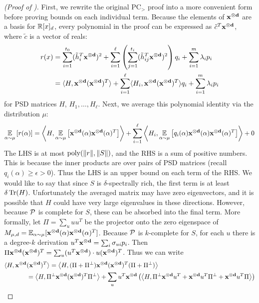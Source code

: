 \begin{proof}[(Proof of )]
First, we rewrite the original PC$_>$ proof into a more convenient form before proving bounds on each individual term. Because the elements of $\mathbf{x^{\otimes d}}$ are a basis for $\mathbb R[x]_d$, every polynomial in the proof can be expressed as $\tilde{c}^T\mathbf{x^{\otimes d}}$, where $\tilde{c}$ is a vector of reals:
\begin{align*} r(x) &= \sum_{i=1}^{t_0} (\tilde{h}_i^T\mathbf{x^{\otimes d}})^2 + \sum_{i=1}^\ell \left(\sum_{j=1}^{t_i} (\tilde{h}_{ij}^T\mathbf{x^{\otimes d}})^2\right)q_i + \sum_{i=1}^m \lambda_i p_i \\
&= \langle H, \mathbf{x^{\otimes d}}(\mathbf{x^{\otimes d}})^T\rangle + \sum_{i=1}^\ell \langle H_i, \mathbf{x^{\otimes d}}(\mathbf{x^{\otimes d}})^T\rangle q_i + \sum_{i=1}^m \lambda_i p_i
\end{align*}
for PSD matrices $H$, $H_1,\dots,H_\ell$. Next, we average this polynomial identity via the distribution $\mu$:
\begin{align*}
\operatorname*{\mathbb{E}}_{\alpha \sim \mu}\left[r(\alpha)\right] &= \left\langle H, \operatorname*{\mathbb{E}}_{\alpha \sim \mu}\left[\mathbf{x^{\otimes d}}(\alpha)\mathbf{x^{\otimes d}}(\alpha)^T\right]\right\rangle + \sum_{i=1}^\ell \left\langle H_i, \operatorname*{\mathbb{E}}_{\alpha \sim \mu}\left[q_i(\alpha)\mathbf{x^{\otimes d}}(\alpha)\mathbf{x^{\otimes d}}(\alpha)^T\right]\right\rangle + 0 \\
\end{align*}
The LHS is at most $\operatorname{poly}(\|r\|, \|S\|)$, and the RHS is a sum of positive numbers. This is because the inner products are over pairs of PSD matrices (recall $q_i(\alpha) \geq \epsilon > 0$). Thus the LHS is an upper bound on each term of the RHS. 
%
We would like to say that since $S$ is $\delta$-spectrally rich, the first term is at least $\delta \operatorname{Tr}(H)$. 
%
Unfortunately the averaged matrix may have zero eigenvectors, and it is possible that $H$ could have very large eigenvalues in these directions. 
%
However, because $\mathcal P$ is complete for $S$, these can be absorbed into the final term. More formally, let $\Pi = \sum_u uu^T$ be the projector onto the zero eigenspace of $M_{\mu,d} = \operatorname*{\mathbb{E}}_{\alpha \sim \mu}[\mathbf{x^{\otimes d}}(\alpha)\mathbf{x^{\otimes d}}(\alpha)^T]$. Because $\mathcal P$ is $k$-complete for $S$, for each $u$ there is a degree-$k$ derivation $u^T\mathbf{x^{\otimes d}} = \sum_i \sigma_{ui} p_i$. Then $\Pi \mathbf{x^{\otimes d}}(\mathbf{x^{\otimes d}})^T = \sum_u (u^T\mathbf{x^{\otimes d}}) \cdot u(\mathbf{x^{\otimes d}})^T$. Thus we can write
\begin{align*}
\langle H, \mbasis{d}&(\mbasis{d})^T\rangle = \Iprod{H, (\Pi + \Pi^\perp)\mbasis{d}(\mbasis{d})^T(\Pi + \Pi^\perp)} \\
&= \Iprod{H, \Pi^\perp \mbasis{d}(\mbasis{d})^T \Pi^\perp} + \sum_u u^T\mbasis{d}\left(\Iprod{H, \Pi^\perp \mbasis{d} u^T + \mbasis{d} u^T\Pi^\perp + \mbasis{d} u^T\Pi}\right) \\

\end{align*}
\end{proof}
